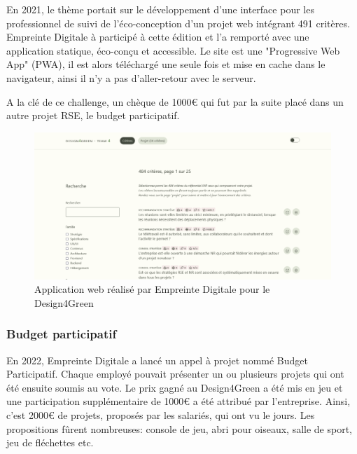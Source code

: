 \documentclass[12pt]{article}
\begin{document}
En 2021, le thème portait sur le développement d'une interface pour les professionnel de suivi de l'éco-conception d'un projet web intégrant 491 critères.
Empreinte Digitale à participé à cette édition et l'a remporté avec une application statique, éco-conçu et accessible.
Le site est une "Progressive Web App" (\gls{PWA}), il est alors téléchargé une seule fois et mise en cache dans le navigateur, ainsi il n'y a pas d'aller-retour avec le serveur.

A la clé de ce challenge, un chèque de 1000€ qui fut par la suite placé dans un autre projet \gls{RSE}, le budget participatif.

\begin{figure}[!ht]
    \centering
    \includegraphics[width=\textwidth]{src/interface_d4g.png}
    \caption{Application web réalisé par Empreinte Digitale pour le Design4Green}
    \label{fig:design4greenl}
\end{figure}

\newpage
\subsubsection{Budget participatif}
En 2022, Empreinte Digitale a lancé un appel à projet nommé Budget Participatif. 
Chaque employé pouvait présenter un ou plusieurs projets qui ont été ensuite soumis au vote. 
Le prix gagné au Design4Green a été mis en jeu et une participation supplémentaire de 1000€ a été attribué par l'entreprise. 
Ainsi, c'est 2000€ de projets, proposés par les salariés, qui ont vu le jours. 
Les propositions fûrent nombreuses: console de jeu, abri pour oiseaux, salle de sport, jeu de fléchettes etc.
\end{document}
